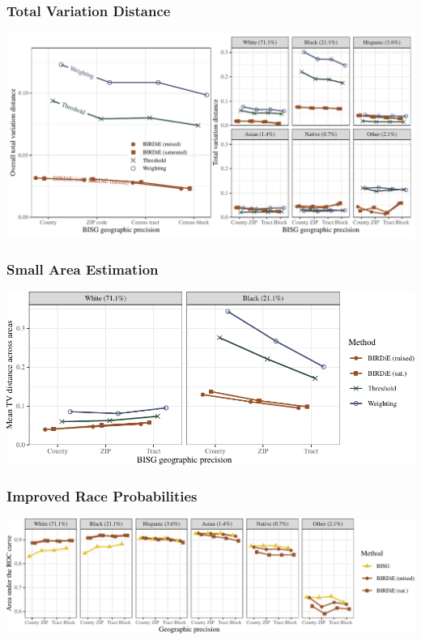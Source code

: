 \documentclass{beamer}
\begin{document}
\begin{frame}

  \frametitle{Total Variation Distance}

  \includegraphics[width=\textwidth]{../paper/figures/nc_tv.pdf}

\end{frame}

\begin{frame}

  \frametitle{Small Area Estimation}

 \includegraphics[width=\textwidth]{../paper/figures/nc_smallarea.pdf}


\end{frame}

\begin{frame}

  \frametitle{Improved Race Probabilities}

 \includegraphics[width=\textwidth]{../paper/figures/nc_roc.pdf}


\end{frame}
\end{document}
